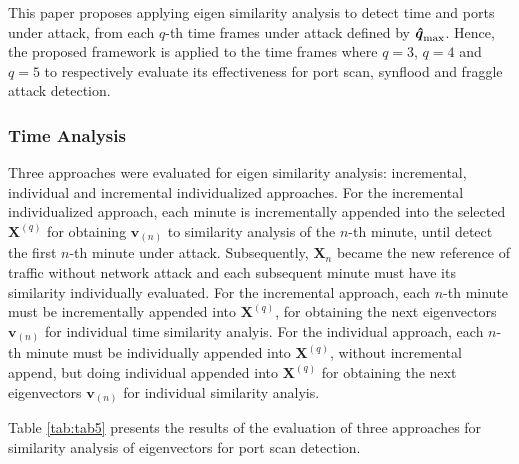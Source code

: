 This paper proposes applying eigen similarity analysis to detect time and ports under attack, from each $q$-th time frames under attack defined by $\rm{\boldsymbol{\hat{q}}}_{\rm max}$. Hence, the proposed framework is applied to the time frames where $q=3$, $q=4$ and $q=5$ to respectively evaluate its effectiveness for port scan, synflood and fraggle attack detection.

\subsubsection{Time Analysis}
\label{sec:2_TimeAnalysis}

Three approaches were evaluated for eigen similarity analysis: incremental, individual and incremental individualized approaches. For the incremental individualized approach, each minute is incrementally appended into the selected $\boldsymbol{X}^{(q)}$ for obtaining $\boldsymbol{v}_{(n)}$ to similarity analysis of the $n$-th minute, until detect the first $n$-th minute under attack. Subsequently, $\boldsymbol{X}_n$ became the new reference of traffic without network attack and each subsequent minute must have its similarity individually evaluated. For the incremental approach, each $n$-th minute must be incrementally appended into $\boldsymbol{X}^{(q)}$, for obtaining the next eigenvectors $\boldsymbol{v}_{(n)}$ for individual time similarity analyis. For the individual approach, each $n$-th minute must be individually appended into $\boldsymbol{X}^{(q)}$, without incremental append, but doing individual appended into $\boldsymbol{X}^{(q)}$ for obtaining the next eigenvectors $\boldsymbol{v}_{(n)}$ for individual similarity analyis.

Table \ref{tab:tab5} presents the results of the evaluation of three approaches for similarity analysis of eigenvectors for port scan detection.

